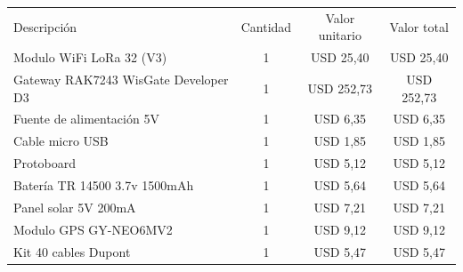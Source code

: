 \documentclass[
11pt, %
]{charter}
\begin{document}
\begin{table}[htpb]
\centering
\begin{tabularx}{\linewidth}{@{}|X|c|r|r|@{}}
\hline
\rowcolor[HTML]{C0C0C0} 
\multicolumn{4}{|c|}{\cellcolor[HTML]{C0C0C0}COSTOS DIRECTOS} \\ \hline
\rowcolor[HTML]{C0C0C0} 
Descripción &
  \multicolumn{1}{c|}{\cellcolor[HTML]{C0C0C0}Cantidad} &
  \multicolumn{1}{c|}{\cellcolor[HTML]{C0C0C0}Valor unitario} &
  \multicolumn{1}{c|}{\cellcolor[HTML]{C0C0C0}Valor total} \\ \hline
  
  \multicolumn{1}{|l|}{Modulo WiFi LoRa 32 (V3)} &
  \multicolumn{1}{c|}{1} &
  \multicolumn{1}{c|}{USD 25,40} &
  \multicolumn{1}{c|}{USD 25,40} \\ \hline
  
  \multicolumn{1}{|l|}{Gateway RAK7243 WisGate Developer D3} &
  \multicolumn{1}{c|}{1} &
  \multicolumn{1}{c|}{USD 252,73} &
  \multicolumn{1}{c|}{USD 252,73} \\ \hline
  
  \multicolumn{1}{|l|}{Fuente de alimentación 5V} &
  \multicolumn{1}{c|}{1} &
  \multicolumn{1}{c|}{USD 6,35} &
  \multicolumn{1}{c|}{USD 6,35} \\ \hline
  
  \multicolumn{1}{|l|}{Cable micro USB} &
  \multicolumn{1}{c|}{1} &
  \multicolumn{1}{c|}{USD 1,85} &
  \multicolumn{1}{c|}{USD 1,85} \\ \hline
  
  \multicolumn{1}{|l|}{Protoboard} &
  \multicolumn{1}{c|}{1} &
  \multicolumn{1}{c|}{USD 5,12} &
  \multicolumn{1}{c|}{USD 5,12} \\ \hline
  
  \multicolumn{1}{|l|}{Batería TR 14500 3.7v 1500mAh} &
  \multicolumn{1}{c|}{1} &
  \multicolumn{1}{c|}{USD 5,64} &
  \multicolumn{1}{c|}{USD 5,64} \\ \hline  
   
  \multicolumn{1}{|l|}{Panel solar 5V 200mA} &
  \multicolumn{1}{c|}{1} &
  \multicolumn{1}{c|}{USD 7,21} &
  \multicolumn{1}{c|}{USD 7,21} \\ \hline  
  
  \multicolumn{1}{|l|}{Modulo GPS GY-NEO6MV2} &
  \multicolumn{1}{c|}{1} &
  \multicolumn{1}{c|}{USD 9,12} &
  \multicolumn{1}{c|}{USD 9,12} \\ \hline    
  
  \multicolumn{1}{|l|}{Kit 40 cables Dupont} &
  \multicolumn{1}{c|}{1} &
  \multicolumn{1}{c|}{USD 5,47} &
  \multicolumn{1}{c|}{USD 5,47} \\ \hline  
  

\end{tabularx}
\end{table}
\end{document}
